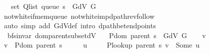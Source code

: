 \begin{isabellebody}
\ \ \ {\isachardoublequoteopen}set\ {\isacharparenleft}{\kern0pt}Q{\isacharunderscore}{\kern0pt}list\ {\isacharparenleft}{\kern0pt}queue\ s{\isacharparenright}{\kern0pt}{\isacharparenright}{\kern0pt}\ {\isasymsubseteq}\ G{\isachardot}{\kern0pt}dV\ G{\isachardoublequoteclose}%
\endisataginvisible
{\isafoldinvisible}%
%
\isadeliminvisible
\isanewline
%
\endisadeliminvisible
%
\isadelimproof
\ \ %
\endisadelimproof
%
\isatagproof
{}\isamarkupfalse%
\ not{\isacharunderscore}{\kern0pt}white{\isacharunderscore}{\kern0pt}if{\isacharunderscore}{\kern0pt}mem{\isacharunderscore}{\kern0pt}queue\ not{\isacharunderscore}{\kern0pt}white{\isacharunderscore}{\kern0pt}imp{\isacharunderscore}{\kern0pt}dpath{\isacharunderscore}{\kern0pt}rev{\isacharunderscore}{\kern0pt}follow\isanewline
\ \ \isamarkupfalse%
\ {\isacharparenleft}{\kern0pt}auto\ simp\ add{\isacharcolon}{\kern0pt}\ G{\isachardot}{\kern0pt}dV{\isacharunderscore}{\kern0pt}def\ intro{\isacharcolon}{\kern0pt}\ dpath{\isacharunderscore}{\kern0pt}bet{\isacharunderscore}{\kern0pt}endpoints{\isacharparenleft}{\kern0pt}{}{\isacharparenright}{\kern0pt}{\isacharparenright}{\kern0pt}%
\endisatagproof
{\isafoldproof}%
%
\isadelimproof
\isanewline
%
\endisadelimproof
%
\isadeliminvisible
\isanewline
%
\endisadeliminvisible
%
\isataginvisible
{}\isamarkupfalse%
\ {\isacharparenleft}{\kern0pt}\ bfs{\isacharunderscore}{\kern0pt}invar{\isacharparenright}{\kern0pt}\ dom{\isacharunderscore}{\kern0pt}parent{\isacharunderscore}{\kern0pt}subset{\isacharunderscore}{\kern0pt}dV{\isacharcolon}{\kern0pt}\isanewline
\ \ \ {\isachardoublequoteopen}P{\isachardot}{\kern0pt}dom\ {\isacharparenleft}{\kern0pt}parent\ s{\isacharparenright}{\kern0pt}\ {\isasymsubseteq}\ G{\isachardot}{\kern0pt}dV\ G{\isachardoublequoteclose}%
\endisataginvisible
{\isafoldinvisible}%
%
\isadeliminvisible
\isanewline
%
\endisadeliminvisible
%
\isadelimproof
%
\endisadelimproof
%
\isatagproof
{}\isamarkupfalse%
\isanewline
\ \ \isamarkupfalse%
\ v\isanewline
\ \ \isamarkupfalse%
\ {\isachardoublequoteopen}v\ {\isasymin}\ P{\isachardot}{\kern0pt}dom\ {\isacharparenleft}{\kern0pt}parent\ s{\isacharparenright}{\kern0pt}{\isachardoublequoteclose}\isanewline
\ \ \isamarkupfalse%
\ \isamarkupfalse%
\ u\ \isanewline
\ \ \ \ {\isachardoublequoteopen}P{\isacharunderscore}{\kern0pt}lookup\ {\isacharparenleft}{\kern0pt}parent\ s{\isacharparenright}{\kern0pt}\ v\ {\isacharequal}{\kern0pt}\ Some\ u{\isachardoublequoteclose}\isanewline

\end{isabellebody}
